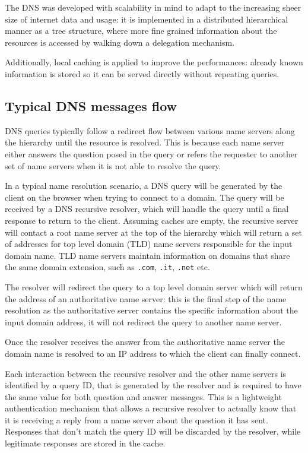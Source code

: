 \documentclass[11pt,a4paper]{article}
\begin{document}
\hfill \break
\noindent
The DNS was developed with scalability in mind to adapt to the increasing sheer size of internet data and usage: it is implemented in a distributed hierarchical manner as a tree structure, where more fine grained information about the resources is accessed by walking down a delegation mechanism.

\noindent
Additionally, local caching is applied to improve the performances: already known information is stored so it can be served directly without repeating queries.

\subsection{Typical DNS messages flow}
DNS queries typically follow a redirect flow between various name servers along the hierarchy until the resource is resolved. This is because each name server either answers the question posed in the query or refers the requester to another set of name servers when it is not able to resolve the query.

\hfill \break
\noindent
In a typical name resolution scenario, a DNS query will be generated by the client on the browser when trying to connect to a domain. The query will be received by a DNS recursive resolver, which will handle the query until a final response to return to the client. Assuming caches are empty, the recursive server will contact a root name server at the top of the hierarchy which will return a set of addresses for top level domain (TLD) name servers responsible for the input domain name. TLD name servers maintain information on domains that share the same domain extension, such as \texttt{.com}, \texttt{.it}, \texttt{.net} etc.

\noindent
The resolver will redirect the query to a top level domain server which will return the address of an authoritative name server: this is the final step of the name resolution as the authoritative server contains the specific information about the input domain address, it will not redirect the query to another name server.

\noindent
Once the resolver receives the answer from the authoritative name server the domain name is resolved to an IP address to which the client can finally connect.

\hfill \break
\noindent
Each interaction between the recursive resolver and the other name servers is identified by a query ID, that is generated by the resolver and is required to have the same value for both question and answer messages. This is a lightweight authentication mechanism that allows a recursive resolver to actually know that it is receiving a reply from a name server about the question it has sent. Responses that don't match the query ID will be discarded by the resolver, while legitimate responses are stored in the cache.
\end{document}
